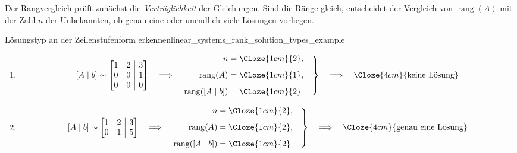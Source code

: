 Der Rangvergleich prüft zunächst die \emph{Verträglichkeit}
 der Gleichungen. Sind die Ränge gleich, entscheidet
der Vergleich von $\operatorname{rang}(A)$ mit der Zahl $n$ der Unbekannten,
ob genau eine oder unendlich viele Lösungen vorliegen.

\clearpage
\begin{ExampleBox}{Lösungstyp an der Zeilenstufenform erkennen}{linear_systems_rank_solution_types_example}
  \begin{enumerate}[label=\alph*),leftmargin=1.8em,itemsep=1.3em]
    \item
      \[
        [A\mid b]\sim
        \left[
          \begin{array}{@{}rr|r@{}}
            1&2&3\\
            0&0&1\\
            0&0&0
          \end{array}
        \right]
        \quad\Longrightarrow\quad
        \left.
        \begin{aligned}
          n&=\Cloze{1cm}{2},\\[0.5em]
          \operatorname{rang}(A)&=\Cloze{1cm}{1},\\[0.5em]
          \operatorname{rang}([A\mid b])&=\Cloze{1cm}{2}
        \end{aligned}
        \quad\right\}
        \quad\Longrightarrow\quad
        \Cloze{4cm}{\text{keine Lösung}}
      \]

    \item
      \[
        [A\mid b]\sim
        \left[
          \begin{array}{@{}rr|r@{}}
            1&2&3\\
            0&1&5
          \end{array}
        \right]
        \quad\Longrightarrow\quad
        \left.
        \begin{aligned}
          n&=\Cloze{1cm}{2},\\[0.5em]
          \operatorname{rang}(A)&=\Cloze{1cm}{2},\\[0.5em]
          \operatorname{rang}([A\mid b])&=\Cloze{1cm}{2}
        \end{aligned}
        \quad\right\}
        \quad\Longrightarrow\quad
        \Cloze{4cm}{\text{genau eine Lösung}}
      \]


\end{enumerate}
\end{ExampleBox}
